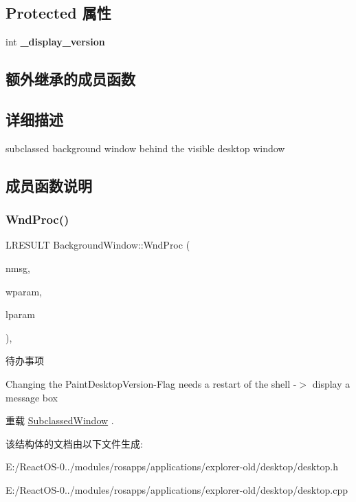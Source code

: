 \subsection*{Protected 属性}
\begin{DoxyCompactItemize}
\item 
\mbox{\label{struct_background_window_a0342381428d9a27686483e0de61c26bd}} 
int {\bfseries \+\_\+display\+\_\+version}
\end{DoxyCompactItemize}
\subsection*{额外继承的成员函数}


\subsection{详细描述}
subclassed background window behind the visible desktop window 

\subsection{成员函数说明}
\mbox{\label{struct_background_window_a53a46176409524ff6f457230e07d3229}} 
\subsubsection{\texorpdfstring{Wnd\+Proc()}{WndProc()}}
{\footnotesize\ttfamily L\+R\+E\+S\+U\+LT Background\+Window\+::\+Wnd\+Proc (\begin{DoxyParamCaption}\item[{U\+I\+NT}]{nmsg,  }\item[{W\+P\+A\+R\+AM}]{wparam,  }\item[{L\+P\+A\+R\+AM}]{lparam }\end{DoxyParamCaption})\hspace{0.3cm}{\ttfamily [protected]}, {\ttfamily [virtual]}}

\begin{DoxyRefDesc}{待办事项}
\item[\hyperlink{todo__todo000010}{待办事项}]Changing the Paint\+Desktop\+Version-\/\+Flag needs a restart of the shell -\/$>$ display a message box \end{DoxyRefDesc}


重载 \hyperlink{struct_subclassed_window}{Subclassed\+Window} .



该结构体的文档由以下文件生成\+:\begin{DoxyCompactItemize}
\item 
E\+:/\+React\+O\+S-\/0../modules/rosapps/applications/explorer-\/old/desktop/desktop.\+h\item 
E\+:/\+React\+O\+S-\/0../modules/rosapps/applications/explorer-\/old/desktop/desktop.\+cpp\end{DoxyCompactItemize}
